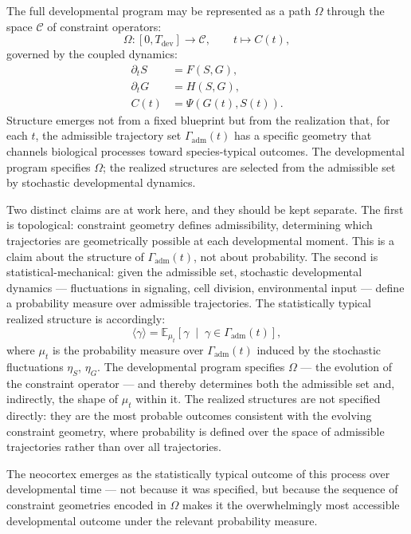 \documentclass[12pt, a4paper, openany]{book}
\theoremstyle{definition}
\theoremstyle{remark}
\begin{document}
The full developmental program may be represented as a path $\Omega$ through the space $\mathcal{C}$ of constraint operators:
\begin{equation}
\Omega : [0, T_{\text{dev}}] \to \mathcal{C}, \qquad t \mapsto C(t),
\end{equation}
governed by the coupled dynamics:
\begin{align}
\partial_t S &= F(S, G), \\
\partial_t G &= H(S, G), \\
C(t) &= \Psi(G(t), S(t)).
\end{align}
Structure emerges not from a fixed blueprint but from the realization that, for each $t$, the admissible trajectory set $\Gamma_{\text{adm}}(t)$ has a specific geometry that channels biological processes toward species-typical outcomes. The developmental program specifies $\Omega$; the realized structures are selected from the admissible set by stochastic developmental dynamics.

Two distinct claims are at work here, and they should be kept separate. The first is topological: constraint geometry defines admissibility, determining which trajectories are geometrically possible at each developmental moment. This is a claim about the structure of $\Gamma_{\mathrm{adm}}(t)$, not about probability. The second is statistical-mechanical: given the admissible set, stochastic developmental dynamics — fluctuations in signaling, cell division, environmental input — define a probability measure over admissible trajectories. The statistically typical realized structure is accordingly:
\begin{equation}
\langle \gamma \rangle = \mathbb{E}_{\mu_t}\!\left[ \gamma \;\middle|\; \gamma \in \Gamma_{\text{adm}}(t) \right],
\end{equation}
where $\mu_t$ is the probability measure over $\Gamma_{\mathrm{adm}}(t)$ induced by the stochastic fluctuations $\eta_S$, $\eta_G$. The developmental program specifies $\Omega$ — the evolution of the constraint operator — and thereby determines both the admissible set and, indirectly, the shape of $\mu_t$ within it. The realized structures are not specified directly: they are the most probable outcomes consistent with the evolving constraint geometry, where probability is defined over the space of admissible trajectories rather than over all trajectories.

The neocortex emerges as the statistically typical outcome of this process over developmental time — not because it was specified, but because the sequence of constraint geometries encoded in $\Omega$ makes it the overwhelmingly most accessible developmental outcome under the relevant probability measure.
\end{document}
